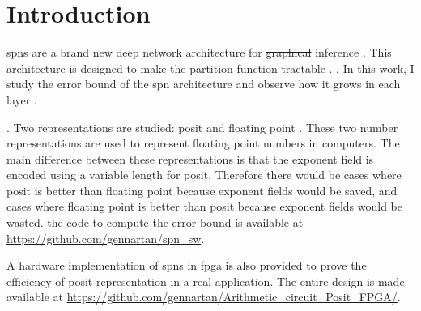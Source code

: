 
\chapter{Introduction}
\label{cha:intro}


\Glspl{spn} are a brand new deep network architecture for \sout{graphical}  inference \cite{spns}. This architecture is designed to make the partition function tractable . . In this work, I study the error bound of the \gls{spn} architecture and observe how it grows in each layer .

. Two representations are studied: posit \cite{posit_std} and floating point \cite{float_std}. These two number representations are used to represent \sout{floating point}  numbers in computers. The main difference between these representations is that the exponent field is encoded using a variable length for posit. Therefore there would be cases where posit is better than floating point because exponent fields would be saved, and cases where floating point is better than posit because exponent fields would be wasted. the code to compute the error bound  is available at \url{https://github.com/gennartan/spn_sw}.

A hardware implementation of \glspl{spn} in \gls{fpga} is also provided to prove the efficiency of posit representation in a real application. The entire design is made available at \url{https://github.com/gennartan/Arithmetic_circuit_Posit_FPGA/}. 

